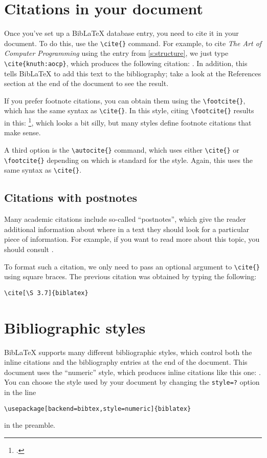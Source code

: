 \documentclass{article}
\newcommand*{\code}[1]{\texttt{#1}}
\begin{document}
\section{Citations in your document}
\label{s:citing}
Once you've set up a Bib\LaTeX{} database entry, you need to cite it in your document.
To do this, use the \code{\textbackslash{}cite\{\}} command.
For example, to cite \textit{The Art of Computer Programming} using the entry from \cref{s:structure}, we just type \code{\textbackslash{}cite\{knuth:aocp\}}, which produces the following citation: \cite{knuth:aocp}.
In addition, this tells Bib\LaTeX{} to add this text to the bibliography; take a look at the References section at the end of the document to see the result.

If you prefer footnote citations, you can obtain them using the \code{\textbackslash{}footcite\{\}}, which has the same syntax as \code{\textbackslash{}cite\{\}}.
In this style, citing \code{\textbackslash{}footcite\{\}} results in this: \footcite{biblatex}, which looks a bit silly, but many styles define footnote citations that make sense.

A third option is the \code{\textbackslash{}autocite\{\}} command, which uses either \code{\textbackslash{}cite\{\}} or \code{\textbackslash{}footcite\{\}} depending on which is standard for the style.
Again, this uses the same syntax as \code{\textbackslash{}cite\{\}}.

\subsection{Citations with postnotes}
\label{s:postnotes}
Many academic citations include so-called \enquote{postnotes}, which give the reader additional information about where in a text they should look for a particular piece of information.
For example, if you want to read more about this topic, you should consult \cite[\S 3.7]{biblatex}.

To format such a citation, we only need to pass an optional argument to \code{\textbackslash{}cite\{\}} using square braces.
The previous citation was obtained by typing the following:
\begin{verbatim}
\cite[\S 3.7]{biblatex}
\end{verbatim}

\section{Bibliographic styles}
\label{s:styles}
Bib\LaTeX{} supports many different bibliographic styles, which control both the inline citations and the bibliography entries at the end of the document.
This document uses the \enquote{numeric} style, which produces inline citations like this one: \cite{biblatex}.
You can choose the style used by your document by changing the \code{style=?} option in the line
\begin{verbatim}
\usepackage[backend=bibtex,style=numeric]{biblatex}
\end{verbatim}
in the preamble.
\end{document}
